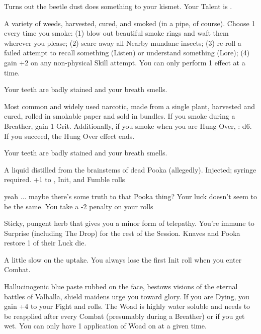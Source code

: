 {\begin{multicols}{2}
    Turns out the beetle dust does something to your kismet.   Your \MAX Talent is \DCDOWN.



  A variety of weeds, harvested, cured, and smoked (in a pipe, of course). Choose 1 every time you smoke: (1) blow out beautiful smoke rings and waft them wherever you please; (2) scare away all Nearby mundane insects; (3) re-roll a failed attempt to recall something (Listen) or understand something (Lore); (4) gain +2 on any non-physical Skill \RO attempt.  You can only perform 1 effect at a time.  

     Your teeth are badly stained and your breath smells.



  Most common and widely used narcotic, made from a single plant, harvested and cured, rolled in smokable paper and sold in bundles.  If you smoke during a Breather, gain 1 Grit.  Additionally, if you smoke when you are Hung Over, \RS : d6.  If you succeed, the Hung Over effect ends.

    Your teeth are badly stained and your breath smells.  


  A liquid distilled from the brainstems of dead Pooka (allegedly).  Injected; syringe required.  +1 to \DEX, Init, and Fumble rolls

    yeah ... maybe there's some truth to that Pooka thing?  Your luck doesn't seem to be the same.  You take a -2 penalty on your \DEATH rolls


  Sticky, pungent herb that gives you a minor form of telepathy.  You're immune to Surprise (including The Drop) for the rest of the Session.  Knaves and Pooka restore 1 \UD of their Luck die.

    A little slow on the uptake.  You always lose the first Init roll when you enter Combat.



  Hallucinogenic blue paste rubbed on the face, bestows visions of the eternal battles of Valhalla, shield maidens urge you toward glory.  If you are Dying, you gain +4 to your Fight \RO and \DEATH rolls. The Woad is highly water soluble and needs to be reapplied after every Combat (presumably during a Breather) or if you get wet.  You can only have 1 application of Woad on at a given time.


\end{multicols}}
